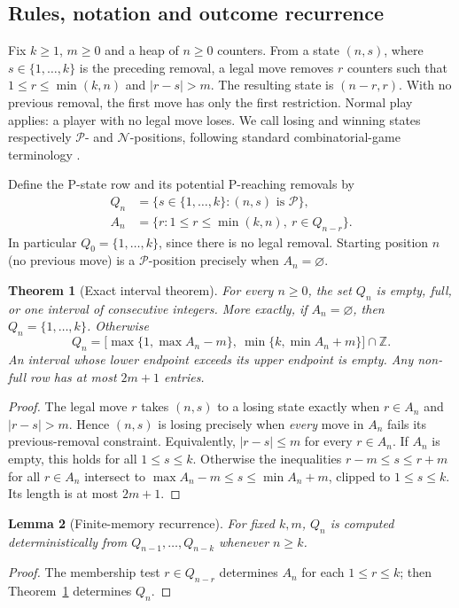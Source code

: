 \documentclass[11pt]{article}
\newtheorem{theorem}{Theorem}[section]
\newtheorem{lemma}[theorem]{Lemma}
\theoremstyle{remark}
\newcommand{\Pset}{\mathcal{P}}
\newcommand{\Nset}{\mathcal{N}}
\begin{document}
\subsection{Rules, notation and outcome recurrence}
Fix $k\ge1$, $m\ge0$ and a heap of $n\ge0$ counters. From a state $(n,s)$, where $s\in\{1,\ldots,k\}$ is the preceding removal, a legal move removes $r$ counters such that $1\le r\le\min(k,n)$ and $|r-s|>m$. The resulting state is $(n-r,r)$. With no previous removal, the first move has only the first restriction. Normal play applies: a player with no legal move loses. We call losing and winning states respectively $\Pset$- and $\Nset$-positions, following standard combinatorial-game terminology \cite{sprague1935,grundy1939,winningways2001}.

Define the P-state row and its potential P-reaching removals by
\begin{align}
Q_n&=\{s\in\{1,\ldots,k\}:(n,s)\text{ is }\Pset\},\\
A_n&=\{r:1\le r\le\min(k,n),\ r\in Q_{n-r}\}.
\end{align}
In particular $Q_0=\{1,\ldots,k\}$, since there is no legal removal. Starting position $n$ (no previous move) is a $\Pset$-position precisely when $A_n=\varnothing$.

\begin{theorem}[Exact interval theorem]\label{thm:Ainterval}
For every $n\ge0$, the set $Q_n$ is empty, full, or one interval of consecutive integers. More exactly, if $A_n=\varnothing$, then $Q_n=\{1,\ldots,k\}$. Otherwise
\[
\boxed{Q_n=\bigl[\max\{1,\max A_n-m\},\ \min\{k,\min A_n+m\}\bigr]\cap\mathbb Z.}
\]
An interval whose lower endpoint exceeds its upper endpoint is empty. Any non-full row has at most $2m+1$ entries.
\end{theorem}
\begin{proof}
The legal move $r$ takes $(n,s)$ to a losing state exactly when $r\in A_n$ and $|r-s|>m$. Hence $(n,s)$ is losing precisely when \emph{every} move in $A_n$ fails its previous-removal constraint. Equivalently, $|r-s|\le m$ for every $r\in A_n$. If $A_n$ is empty, this holds for all $1\le s\le k$. Otherwise the inequalities $r-m\le s\le r+m$ for all $r\in A_n$ intersect to $\max A_n-m\le s\le\min A_n+m$, clipped to $1\le s\le k$. Its length is at most $2m+1$.
\end{proof}

\begin{lemma}[Finite-memory recurrence]\label{lem:memory}
For fixed $k,m$, $Q_n$ is computed deterministically from $Q_{n-1},\ldots,Q_{n-k}$ whenever $n\ge k$.
\end{lemma}
\begin{proof}The membership test $r\in Q_{n-r}$ determines $A_n$ for each $1\le r\le k$; then Theorem~\ref{thm:Ainterval} determines $Q_n$.\end{proof}
\end{document}
